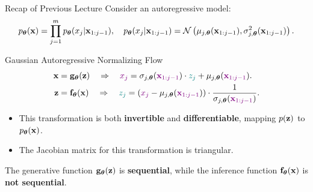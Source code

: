 \documentclass{beamer}
\begin{document}
\begin{frame}{Recap of Previous Lecture}
	Consider an autoregressive model:
	\vspace{-0.3cm}
	{\small
		\[
		p_{\boldsymbol{\theta}}(\mathbf{x}) = \prod_{j=1}^m p_{\boldsymbol{\theta}}(x_j | \mathbf{x}_{1:j - 1}), \quad
		p_{\boldsymbol{\theta}}(x_j | \mathbf{x}_{1:j - 1}) = \mathcal{N} \left(\mu_{j, \boldsymbol{\theta}}(\mathbf{x}_{1:j-1}), \sigma^2_{j, \boldsymbol{\theta}} (\mathbf{x}_{1:j-1})\right).
		\]
	}
	\vspace{-0.5cm}
	\begin{block}{Gaussian Autoregressive Normalizing Flow}
		\vspace{-0.5cm}
		\begin{align*}
			\mathbf{x} &= \mathbf{g}_{\boldsymbol{\theta}}(\mathbf{z}) \quad \Rightarrow \quad {\color{violet} x_j} = \sigma_{j, \boldsymbol{\theta}} ({\color{violet} \mathbf{x}_{1:j-1}}) \cdot {\color{teal} z_j} + \mu_{j, \boldsymbol{\theta}}({\color{violet} \mathbf{x}_{1:j-1}}). \\
			\mathbf{z} &= \mathbf{f}_{\boldsymbol{\theta}}(\mathbf{x}) \quad \Rightarrow \quad {\color{teal} z_j} = \left({\color{violet}x_j} - \mu_{j, \boldsymbol{\theta}}({\color{violet}\mathbf{x}_{1:j-1}}) \right) \cdot \frac{1}{ \sigma_{j, \boldsymbol{\theta}} ({\color{violet}\mathbf{x}_{1:j-1}})}.
		\end{align*}
		\vspace{-0.5cm}
	\end{block}
	\begin{itemize}
		\item This transformation is both \textbf{invertible} and \textbf{differentiable}, mapping $p(\mathbf{z})$ to $p_{\boldsymbol{\theta}}(\mathbf{x})$.
		\item The Jacobian matrix for this transformation is triangular.
	\end{itemize}
	The generative function $\mathbf{g}_{\boldsymbol{\theta}}(\mathbf{z})$ is \textbf{sequential}, while the inference function $\mathbf{f}_{\boldsymbol{\theta}}(\mathbf{x})$ is \textbf{not sequential}.
\end{frame}
\end{document}
